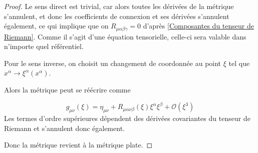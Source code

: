 \begin{proof}
    Le sens direct est trivial, car alors toutes les dérivées de la métrique s'annulent, et donc les coefficients de connexion et ses dérivées s'annulent également, ce qui implique que  on $R_{\mu \alpha \beta \gamma} = 0$ d'après \ref{Composantes du tenseur de Riemann}. Comme il s'agit d'une équation tensorielle, celle-ci sera valable dans n'importe quel référentiel.

    Pour le sens inverse, on choisit un changement de coordonnée au point $\xi$ tel que $x^{\alpha} \rightarrow \xi^{\alpha}(x^{\alpha})$. 

    Alors la métrique peut se réécrire comme

    \begin{equation}
        g_{\mu \nu}(\xi) = \eta_{\mu \nu} + R_{\mu \alpha \nu \beta}(\xi)\xi^\alpha \xi^{\beta} + \mathcal{O}(\xi^{3})
    \end{equation}
    Les termes d'ordre supérieures dépendent des dérivées covariantes du tenseur de Riemann et s'annulent donc également.
    
    Donc la métrique revient à la métrique plate. 
\end{proof}

